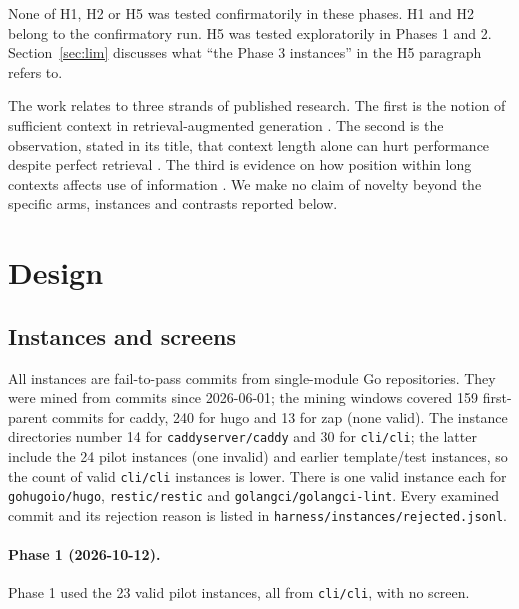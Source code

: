 \documentclass[10pt]{article}
\begin{document}
None of H1, H2 or H5 was tested confirmatorily in these phases. H1 and H2 belong to the confirmatory run. H5 was tested exploratorily in Phases 1 and 2. Section~\ref{sec:lim} discusses what ``the Phase 3 instances'' in the H5 paragraph refers to.

The work relates to three strands of published research. The first is the notion of sufficient context in retrieval-augmented generation \cite{joren2025}. The second is the observation, stated in its title, that context length alone can hurt performance despite perfect retrieval \cite{du2025}. The third is evidence on how position within long contexts affects use of information \cite{liu2024}. We make no claim of novelty beyond the specific arms, instances and contrasts reported below.

\section{Design}

\subsection{Instances and screens}

All instances are fail-to-pass commits from single-module Go repositories. They were mined from commits since 2026-06-01; the mining windows covered 159 first-parent commits for caddy, 240 for hugo and 13 for zap (none valid). The instance directories number 14 for \texttt{caddyserver/caddy} and 30 for \texttt{cli/cli}; the latter include the 24 pilot instances (one invalid) and earlier template/test instances, so the count of valid \texttt{cli/cli} instances is lower. There is one valid instance each for \texttt{gohugoio/hugo}, \texttt{restic/restic} and \texttt{golangci/golangci-lint}. Every examined commit and its rejection reason is listed in \texttt{harness/instances/rejected.jsonl}.

\paragraph{Phase 1 (2026-10-12).} Phase 1 used the 23 valid pilot instances, all from \texttt{cli/cli}, with no screen.
\end{document}
